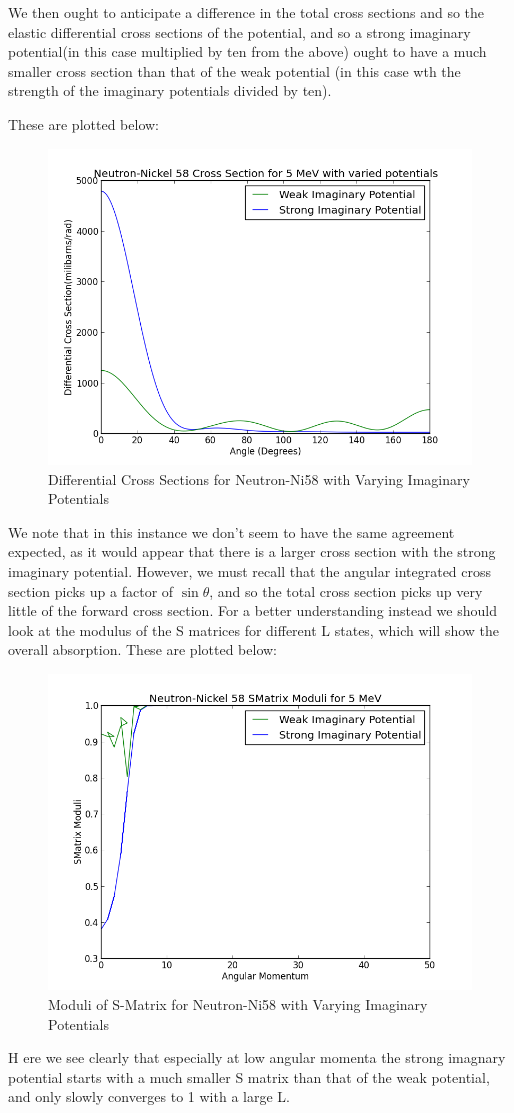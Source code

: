 \documentclass[paper=a4, fontsize=11pt]{scrartcl} %
\numberwithin{equation}{section} %
\numberwithin{figure}{section} %
\numberwithin{table}{section} %
\begin{document}
We then ought to anticipate a difference in the total cross sections and so the elastic differential cross sections of the potential, and so a strong imaginary potential(in this case multiplied by ten from the above) ought to have a much smaller cross section than that of the weak potential (in this case wth the strength of the imaginary potentials divided by ten).

These are plotted below:

 \begin{figure}[hbt!]
        \centering
\includegraphics[width=.6\textwidth]{Imcross}
        \caption{Differential Cross Sections for Neutron-Ni58 with Varying Imaginary Potentials}
\end{figure}
We note that in this instance we don't seem to have the same agreement expected, as it would appear that there is a larger cross section with the strong imaginary potential. However, we must recall that the angular integrated cross section picks up a factor of $\sin\theta$, and so the total cross section picks up very little of the forward cross section. For a better understanding instead we should look at the modulus of the S matrices for different L states, which will show the overall absorption. These are plotted below:\\


 \begin{figure}[hbt!]
        \centering
\includegraphics[width=.6\textwidth]{NeutronSms}

        \caption{Moduli of S-Matrix for Neutron-Ni58 with Varying Imaginary Potentials}
\end{figure}
\FloatBarrier
\vspace{ 5mm}
H
ere we see clearly that especially at low angular momenta the strong imagnary potential starts with a much smaller S matrix than that of the weak potential, and only slowly converges to 1 with a large L. \\
\end{document}
